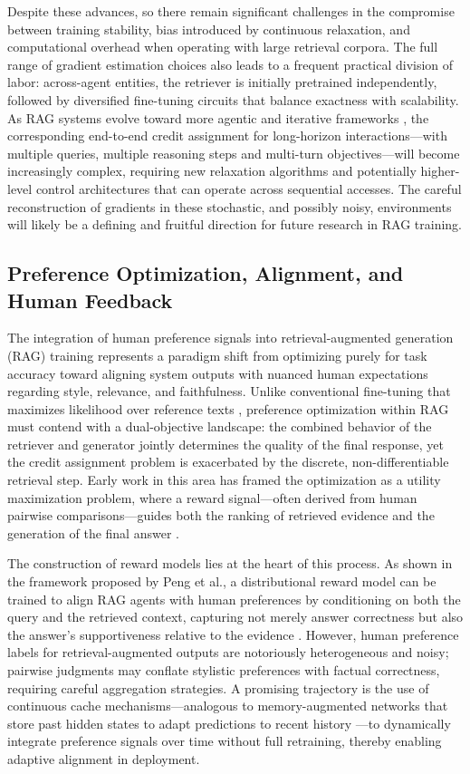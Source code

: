 \documentclass[11pt,a4paper]{article}
\begin{document}
Despite these advances, so there remain significant challenges in the compromise between training stability, bias introduced by continuous relaxation, and computational overhead when operating with large retrieval corpora. The full range of gradient estimation choices also leads to a frequent practical division of labor: across-agent entities, the retriever is initially pretrained independently, followed by diversified fine-tuning circuits that balance exactness with scalability. As RAG systems evolve toward more agentic and iterative frameworks \cite{arxiv:2407.12982v1}, the corresponding end-to-end credit assignment for long-horizon interactions---with multiple queries, multiple reasoning steps and multi-turn objectives---will become increasingly complex, requiring new relaxation algorithms and potentially higher-level control architectures that can operate across sequential accesses. The careful reconstruction of gradients in these stochastic, and possibly noisy, environments will likely be a defining and fruitful direction for future research in RAG training.


\subsection{Preference Optimization, Alignment, and Human Feedback}


The integration of human preference signals into retrieval-augmented generation (RAG) training represents a paradigm shift from optimizing purely for task accuracy toward aligning system outputs with nuanced human expectations regarding style, relevance, and faithfulness. Unlike conventional fine-tuning that maximizes likelihood over reference texts \cite{arxiv:2305.11206v1}, preference optimization within RAG must contend with a dual-objective landscape: the combined behavior of the retriever and generator jointly determines the quality of the final response, yet the credit assignment problem is exacerbated by the discrete, non-differentiable retrieval step. Early work in this area has framed the optimization as a utility maximization problem, where a reward signal---often derived from human pairwise comparisons---guides both the ranking of retrieved evidence and the generation of the final answer \cite{arxiv:2404.05970v1}.

The construction of reward models lies at the heart of this process. As shown in the framework proposed by Peng et al., a distributional reward model can be trained to align RAG agents with human preferences by conditioning on both the query and the retrieved context, capturing not merely answer correctness but also the answer's supportiveness relative to the evidence \cite{arxiv:2311.08401v1}. However, human preference labels for retrieval-augmented outputs are notoriously heterogeneous and noisy; pairwise judgments may conflate stylistic preferences with factual correctness, requiring careful aggregation strategies. A promising trajectory is the use of continuous cache mechanisms---analogous to memory-augmented networks that store past hidden states to adapt predictions to recent history \cite{arxiv:1612.04426v1}---to dynamically integrate preference signals over time without full retraining, thereby enabling adaptive alignment in deployment.
\end{document}
